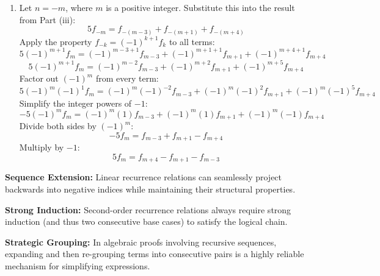\begin{solution}
\begin{enumerate}
    \item[(iv)] Let $n = -m$, where $m$ is a positive integer. Substitute this into the result from Part (iii):
    \[ 5f_{-m} = f_{-(m-3)} + f_{-(m+1)} + f_{-(m+4)} \]
    Apply the property $f_{-k} = (-1)^{k+1}f_k$ to all terms:
    \[ 5(-1)^{m+1}f_m = (-1)^{m-3+1}f_{m-3} + (-1)^{m+1+1}f_{m+1} + (-1)^{m+4+1}f_{m+4} \]
    \[ 5(-1)^{m+1}f_m = (-1)^{m-2}f_{m-3} + (-1)^{m+2}f_{m+1} + (-1)^{m+5}f_{m+4} \]
    Factor out $(-1)^m$ from every term:
    \[ 5(-1)^m(-1)^1 f_m = (-1)^m(-1)^{-2}f_{m-3} + (-1)^m(-1)^2 f_{m+1} + (-1)^m(-1)^5 f_{m+4} \]
    Simplify the integer powers of $-1$:
    \[ -5(-1)^m f_m = (-1)^m (1)f_{m-3} + (-1)^m (1)f_{m+1} + (-1)^m (-1)f_{m+4} \]
    Divide both sides by $(-1)^m$:
    \[ -5f_m = f_{m-3} + f_{m+1} - f_{m+4} \]
    Multiply by $-1$:
    \[ 5f_m = f_{m+4} - f_{m+1} - f_{m-3} \]
\end{enumerate}
\end{solution}
\begin{takeaways}
    \item \textbf{Sequence Extension:} Linear recurrence relations can seamlessly project backwards into negative indices while maintaining their structural properties.
    \item \textbf{Strong Induction:} Second-order recurrence relations always require strong induction (and thus two consecutive base cases) to satisfy the logical chain.
    \item \textbf{Strategic Grouping:} In algebraic proofs involving recursive sequences, expanding and then re-grouping terms into consecutive pairs is a highly reliable mechanism for simplifying expressions.
\end{takeaways}
